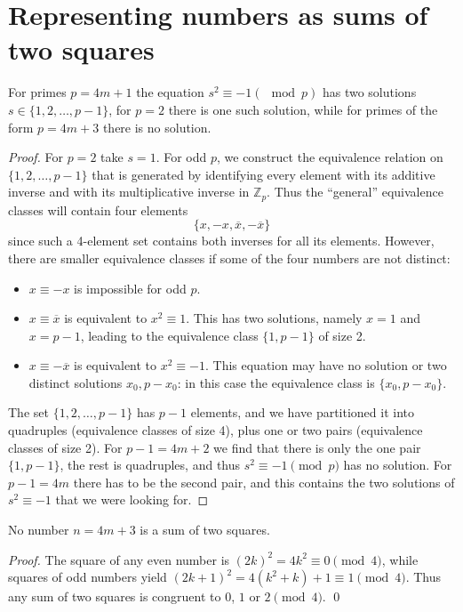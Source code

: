 \chapter{Representing numbers as sums of two squares}

\begin{lemma}[Lemma 1]
  \label{ch04.lemma1}
  For primes \(p = 4m + 1\) the equation \(s^2 \equiv -1 (\mod p)\) has two
  solutions \(s \in \{1, 2, \dots, p - 1\}\), for \(p = 2\) there is one such solution, while
  for primes of the form \(p = 4m + 3\) there is no solution.
\end{lemma}
\begin{proof}
   For $p = 2$ take $s = 1$.
   For odd $p$, we construct the equivalence relation on
   $\{1, 2, \dots, p - 1\}$ that is generated by identifying every
   element with its additive inverse and with its multiplicative inverse
   in $\mathbb{Z}_p$. Thus the ``general'' equivalence classes will contain four elements
  \[
  \{x, -x, \overline{x}, -\overline{x}\}
  \]
since such a 4-element set contains both inverses for all its elements. However,
there are smaller equivalence classes if some of the four numbers are not distinct:

\begin{itemize}
  \item $x \equiv -x$ is impossible for odd $p$.
  \item $x \equiv \overline{x}$ is equivalent to $x^2 \equiv 1$. This has two solutions,
    namely $x = 1$ and $x = p - 1$, leading to the equivalence class $\{1, p - 1\}$ of size 2.
  \item $x \equiv -\overline{x}$ is equivalent to $x^2 \equiv -1$. This equation may
    have no solution or two distinct solutions $x_0, p - x_0$: in this case the equivalence
    class is $\{x_0, p - x_0\}$.
\end{itemize}

The set $\{1, 2, \dots, p - 1\}$ has $p - 1$ elements, and we have partitioned it
into quadruples (equivalence classes of size 4), plus one or two pairs (equivalence
classes of size 2). For $p - 1 = 4m + 2$ we find that there is only the one pair $\{1, p - 1\}$,
the rest is quadruples, and thus $s^2 \equiv -1 \pmod{p}$ has no solution.
For $p - 1 = 4m$ there has to be the second pair,
and this contains the two solutions of $s^2 \equiv -1$ that we were looking for.
\end{proof}


\begin{lemma}[Lemma 2]
  \label{ch04.lemma2}
  No number \(n = 4m + 3\) is a sum of two squares.
\end{lemma}
\begin{proof}
  \leanok
  The square of any even number is $(2k)^2 = 4k^2 \equiv 0 \pmod{4}$,
  while squares of odd numbers yield $(2k + 1)^2 = 4(k^2 + k) + 1 \equiv 1 \pmod{4}$.
  Thus any sum of two squares is congruent to $0$, $1$ or $2 \pmod{4}$. \qed
\end{proof}

